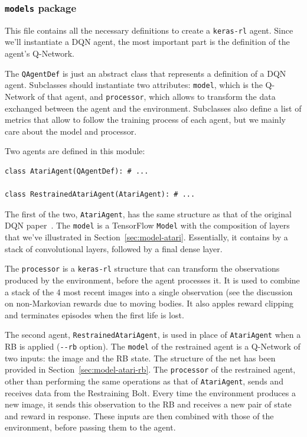 \subsubsection*{\texttt{models} package}

This file contains all the necessary definitions to create a \texttt{keras-rl}
agent. Since we'll instantiate a DQN agent, the most important part is
the definition of the agent's Q-Network.

The \texttt{QAgentDef} is just an abstract class that represents a definition
of a DQN agent. Subclasses should instantiate two attributes:
\texttt{model}, which is the Q-Network of that agent, and \texttt{processor},
which allows to transform the data exchanged between the agent and the
environment.  Subclasses also define a list of metrics that allow to follow
the training process of each agent, but we mainly care about the model and
processor.

Two agents are defined in this module:
\begin{verbatim}
class AtariAgent(QAgentDef): # ...

class RestrainedAtariAgent(AtariAgent): # ...
\end{verbatim}

The first of the two, \texttt{AtariAgent}, has the same structure as that of
the original DQN paper~\cite{bib:atari-deeprl}. The \texttt{model} is a
TensorFlow \texttt{Model} with the composition of layers that we've
illustrated in Section~\ref{sec:model-atari}. Essentially, it contains by a
stack of convolutional layers, followed by a final dense layer.

The \texttt{processor} is a \verb|keras-rl| structure that can transform the
observations produced by the environment, before the agent processes it. It is
used to combine a stack of the 4 most recent images into a single observation
(see the discussion on non-Markovian rewards due to moving bodies. It also
apples reward clipping and terminates episodes when the first life is lost.

The second agent, \texttt{RestrainedAtariAgent}, is used in place of
\texttt{AtariAgent} when a RB is applied (\verb|--rb| option). The
\texttt{model} of the restrained agent is a Q-Network of two inputs: the image
and the RB state. The structure of the net has been provided in
Section~\ref{sec:model-atari-rb}. The \texttt{processor} of the restrained
agent, other than performing the same operations as that of
\texttt{AtariAgent}, sends and receives data from the Restraining Bolt. Every
time the environment produces a new image, it sends this observation to the
RB and receives a new pair of state and reward in response. These inputs are
then combined with those of the environment, before passing them to the agent.

